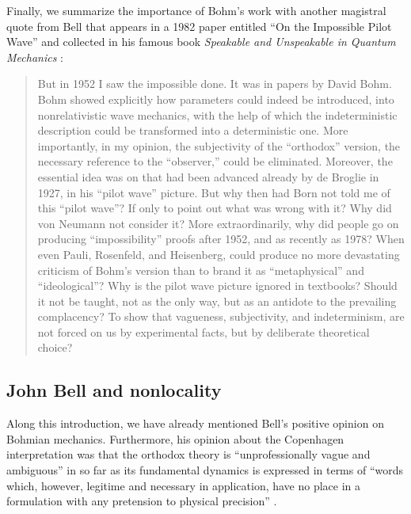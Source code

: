 \documentclass[nofootinbib, secnumarabic, amsmath, nobibnotes,11pt,aps,pra, floatfix]{revtex4-1}
\begin{document}
Finally, we summarize the importance of Bohm's work with another magistral quote from Bell that appears in a 1982 paper entitled ``On the Impossible Pilot Wave'' and collected in his famous book \textit{Speakable and Unspeakable in Quantum Mechanics} \cite{om.Bell1987}:
\begin{quote}
But in 1952 I saw the impossible done. It was in papers by David Bohm. Bohm showed explicitly how parameters could indeed be introduced, into nonrelativistic wave mechanics, with the help of which the indeterministic description could be transformed into a deterministic one. More importantly, in my opinion, the subjectivity of the ``orthodox'' version, the necessary reference to the ``observer,'' could be eliminated. Moreover, the essential idea was on that had been advanced already by de Broglie in 1927, in his ``pilot wave'' picture. But why then had Born not told me of this ``pilot wave''? If only to point out what was wrong with it? Why did von Neumann not consider it? More extraordinarily, why did people go on producing ``impossibility'' proofs after 1952, and as recently as 1978? When even Pauli, Rosenfeld, and Heisenberg, could produce no more devastating criticism of Bohm's version than to brand it as ``metaphysical'' and ``ideological''? Why is the pilot wave picture ignored in textbooks? Should it not be taught, not as the only way, but as an antidote to the prevailing complacency? To show that vagueness, subjectivity, and indeterminism, are not forced on us by experimental facts, but by deliberate theoretical choice?
\end{quote}

\subsection{John Bell and nonlocality} \label{om.sec_intro.8}

Along this introduction, we have already mentioned Bell's positive opinion on Bohmian mechanics. Furthermore, his opinion about the Copenhagen interpretation was that the orthodox theory is ``unprofessionally vague and ambiguous'' \cite{om.Bell1987,om.bell1990,om.bell1982,om.Bell1964} in so far as its fundamental dynamics is expressed in terms of ``words which, however, legitime and necessary in application, have no place in a formulation with any pretension to physical precision'' \cite{om.bell1990}.
\end{document}
